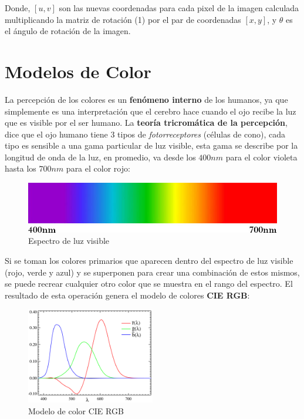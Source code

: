 \documentclass[a4paper, 12pt]{article}
\begin{document}
Donde, $[u,v]$ son las nuevas coordenadas para cada pixel de la imagen calculada multiplicando la matriz de rotación (1) por el par de coordenadas $[x,y]$, y $\theta$ es el ángulo de rotación de la imagen.

\section{Modelos de Color}
La percepción de los colores es un \textbf{fenómeno interno} de los humanos, ya que simplemente es una interpretación que el cerebro hace cuando el ojo recibe la luz que es visible por el ser humano. La \textbf{teoría tricromática de la percepción}, dice que el ojo humano tiene 3 tipos de \emph{fotorreceptores} (células de cono), cada tipo es sensible a una gama particular de luz visible, esta gama se describe por la longitud de onda de la luz, en promedio, va desde los $400nm$ para el color violeta hasta los $700nm$ para el color rojo:

\begin{figure}[!ht]
    \centering
    \includegraphics[width=\textwidth]{img/espectro-visible.jpg}
    \caption{Espectro de luz visible}
    \label{fig:espectro-luz-visible}
\end{figure}

Si se toman los colores primarios que aparecen dentro del espectro de luz visible (rojo, verde y azul) y se superponen para crear una combinación de estos mismos, se puede recrear cualquier otro color que se muestra en el rango del espectro. El resultado de esta operación genera el modelo de colores \textbf{CIE RGB}:

\begin{figure}[!ht]
    \centering
    \includegraphics[width=0.5\textwidth]{img/cie-rgb.png}
    \caption{Modelo de color CIE RGB}
    \label{fig:modelo-cie-rgb}
\end{figure}
\end{document}
